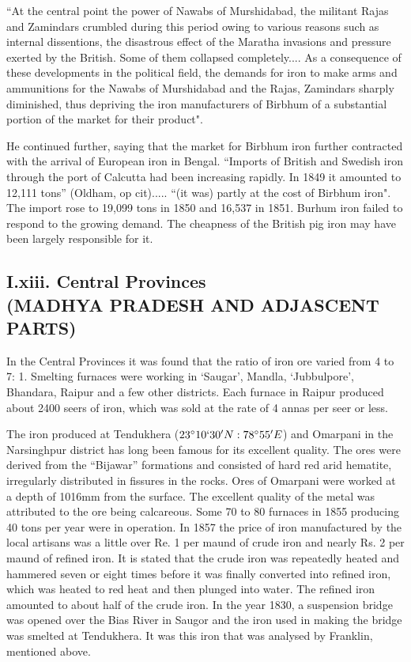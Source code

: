 \newpage

\footnotesize{``At the central point the power of Nawabs of Murshidabad, the militant Rajas and Zamindars crumbled during this period owing to various reasons such as internal dissentions, the disastrous effect of the Maratha invasions and pressure exerted by the British.  Some of them collapsed completely.... As a consequence of these developments in the political field, the demands for iron to make arms and ammunitions for the Nawabs of Murshidabad and the Rajas, Zamindars sharply diminished, thus depriving the iron manufacturers of Birbhum of a substantial portion of the market for their product".}  

He continued further, saying that the market for Birbhum iron further contracted with the arrival of European iron in Bengal.  “Imports of British and Swedish iron through the port of Calcutta had been increasing rapidly.  In 1849 it amounted to 12,111 tons” (Oldham, op cit)..... “(it was) partly at the cost of Birbhum iron".  The import rose to 19,099 tons in 1850 and 16,537 in 1851.  Burhum iron failed to respond to the growing demand.  The cheapness of the British pig iron may have been largely responsible for it.

\vspace{-.3cm}

\subsection*{I.xiii.  Central Provinces\\ (MADHYA PRADESH AND ADJASCENT PARTS)}\label{subsection-13}

\vspace{-.2cm}

In the Central Provinces it was found that the ratio of iron ore varied from 4 to 7: 1. Smelting furnaces were working in ‘Saugar’, Mandla, `Jubbulpore', Bhandara, Raipur and a few other districts. Each furnace in Raipur produced about 2400 seers of iron, which was sold at the rate of 4 annas per seer or less. 

The iron produced at Tendukhera ($23^\circ 10` 30'N: 78^\circ 55'E$) and Omar\-pani in the Narsinghpur district has long been famous for its excellent quality. The ores were derived from the “Bijawar” formations and consisted of hard red arid hematite, irregularly distributed in fissures in the rocks. Ores of Omarpani were worked at a depth of 1016mm from the surface. The excellent quality of the metal was attributed to the ore being calcareous. Some 70 to 80 furnaces in 1855 producing 40 tons per year were in operation. In 1857 the price of iron manufac\-tured by the local artisans was a little over Re. 1 per maund of crude iron and nearly Rs. 2 per maund of refined iron. It is stated that the crude iron was repeatedly heated and hammered seven or eight times before it was finally converted into refined iron, which was heated to red heat and then plunged into water. The refined iron amounted to about half of the crude iron. In the year 1830, a suspension bridge was opened over the Bias River in Saugor and the iron used in making the bridge was smelted at Tendukhera. It was this iron that was analysed by Franklin, mentioned above.

